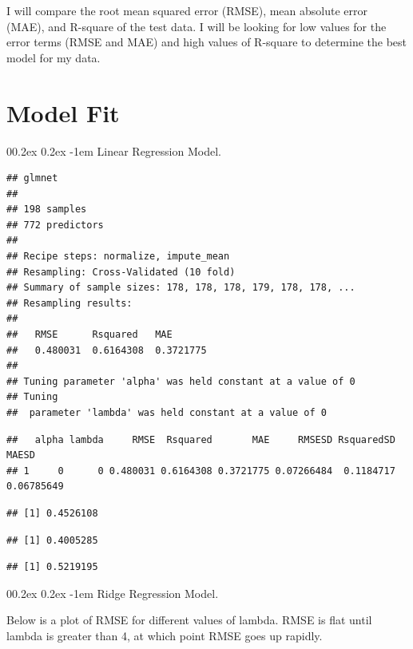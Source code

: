 \documentclass[
  man,floatsintext]{apa6}
\makeatletter
\let\oldparagraph\paragraph
\renewcommand{\paragraph}[1]{\oldparagraph{#1}\mbox{}}
\renewcommand{\paragraph}{\@startsection{paragraph}{4}{\parindent}%
  {0\baselineskip \@plus 0.2ex \@minus 0.2ex}%
  {-1em}%
  {\normalfont\normalsize\bfseries\itshape\typesectitle}}
\makeatother
\begin{document}
I will compare the root mean squared error (RMSE), mean absolute error (MAE), and R-square of the test data. I will be looking for low values for the error terms (RMSE and MAE) and high values of R-square to determine the best model for my data.

\hypertarget{model-fit}{%
\section{Model Fit}\label{model-fit}}

\hypertarget{linear-regression-model.}{%
\paragraph{Linear Regression Model.}\label{linear-regression-model.}}

\begin{verbatim}
## glmnet 
## 
## 198 samples
## 772 predictors
## 
## Recipe steps: normalize, impute_mean 
## Resampling: Cross-Validated (10 fold) 
## Summary of sample sizes: 178, 178, 178, 179, 178, 178, ... 
## Resampling results:
## 
##   RMSE      Rsquared   MAE      
##   0.480031  0.6164308  0.3721775
## 
## Tuning parameter 'alpha' was held constant at a value of 0
## Tuning
##  parameter 'lambda' was held constant at a value of 0
\end{verbatim}

\begin{verbatim}
##   alpha lambda     RMSE  Rsquared       MAE     RMSESD RsquaredSD      MAESD
## 1     0      0 0.480031 0.6164308 0.3721775 0.07266484  0.1184717 0.06785649
\end{verbatim}

\begin{verbatim}
## [1] 0.4526108
\end{verbatim}

\begin{verbatim}
## [1] 0.4005285
\end{verbatim}

\begin{verbatim}
## [1] 0.5219195
\end{verbatim}

\hypertarget{ridge-regression-model.}{%
\paragraph{Ridge Regression Model.}\label{ridge-regression-model.}}

Below is a plot of RMSE for different values of lambda. RMSE is flat until lambda is greater than 4, at which point RMSE goes up rapidly.
\end{document}
